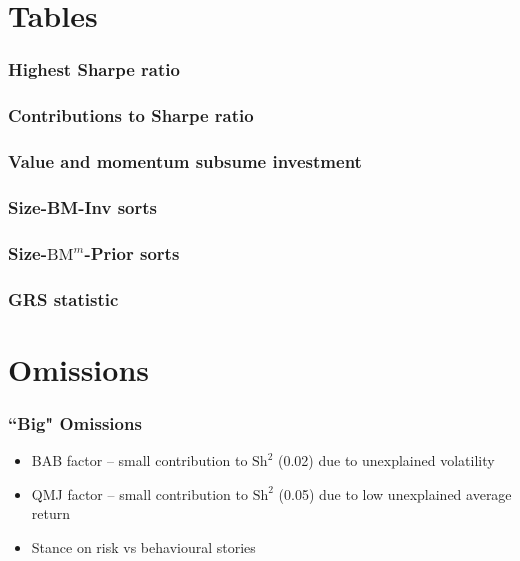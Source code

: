 \documentclass{beamer}
\begin{document}
\section{Tables}

\begin{frame}
\frametitle{Highest Sharpe ratio}
\resizebox{\linewidth}{!}{}
\end{frame}

\begin{frame}
\frametitle{Contributions to Sharpe ratio}
\begin{center}
\resizebox*{!}{\dimexpr\textheight-1.3cm\relax}{
    
    }
\end{center}
\end{frame}

\begin{frame}
\frametitle{Value and momentum subsume investment}
\begin{center}
\resizebox*{!}{\dimexpr\textheight-1.3cm\relax}{
    
    }
\end{center}
\end{frame}

\begin{frame}
\frametitle{Size-BM-Inv sorts}
\begin{center}
\resizebox*{!}{\dimexpr\textheight-1.3cm\relax}{
    
    }
\end{center}
\end{frame}
\begin{frame}
\frametitle{Size-$\text{BM}^m$-Prior sorts}
\begin{center}
\resizebox*{!}{\dimexpr\textheight-1.3cm\relax}{
    
    }
\end{center}
\end{frame}

\begin{frame}
\frametitle{GRS statistic}
\begin{center}
\resizebox*{!}{\dimexpr\textheight-1.3cm\relax}{
    
    }
\end{center}
\end{frame}

\section{Omissions}

\begin{frame}
\frametitle{``Big" Omissions}
\begin{itemize}
    \item BAB factor -- small contribution to $\text{Sh}^2$ (0.02) due to
    unexplained volatility
    \item QMJ factor -- small contribution to $\text{Sh}^2$ (0.05) due to low
    unexplained average return
    \item Stance on risk vs behavioural stories
\end{itemize}
\end{frame}
\end{document}
